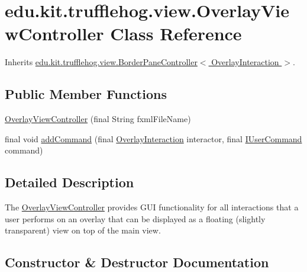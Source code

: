 \hypertarget{classedu_1_1kit_1_1trufflehog_1_1view_1_1_overlay_view_controller}{}\section{edu.\+kit.\+trufflehog.\+view.\+Overlay\+View\+Controller Class Reference}
\label{classedu_1_1kit_1_1trufflehog_1_1view_1_1_overlay_view_controller}


Inherits \hyperlink{classedu_1_1kit_1_1trufflehog_1_1view_1_1_border_pane_controller}{edu.\+kit.\+trufflehog.\+view.\+Border\+Pane\+Controller$<$ Overlay\+Interaction $>$}.

\subsection*{Public Member Functions}
\begin{DoxyCompactItemize}
\item 
\hyperlink{classedu_1_1kit_1_1trufflehog_1_1view_1_1_overlay_view_controller_a1a6873cb9bb74001d145aaefb6e76fe4}{Overlay\+View\+Controller} (final String fxml\+File\+Name)
\item 
final void \hyperlink{classedu_1_1kit_1_1trufflehog_1_1view_1_1_overlay_view_controller_a472307ed29bc57c00728132e423fc92a}{add\+Command} (final \hyperlink{enumedu_1_1kit_1_1trufflehog_1_1interaction_1_1_overlay_interaction}{Overlay\+Interaction} interactor, final \hyperlink{interfaceedu_1_1kit_1_1trufflehog_1_1command_1_1usercommand_1_1_i_user_command}{I\+User\+Command} command)
\end{DoxyCompactItemize}


\subsection{Detailed Description}
The \hyperlink{classedu_1_1kit_1_1trufflehog_1_1view_1_1_overlay_view_controller}{Overlay\+View\+Controller} provides G\+U\+I functionality for all interactions that a user performs on an overlay that can be displayed as a floating (slightly transparent) view on top of the main view. 

\subsection{Constructor \& Destructor Documentation}
\hypertarget{classedu_1_1kit_1_1trufflehog_1_1view_1_1_overlay_view_controller_a1a6873cb9bb74001d145aaefb6e76fe4}{}
